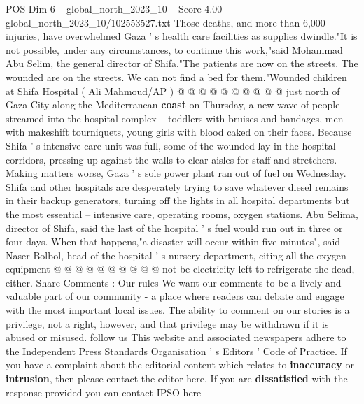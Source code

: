 \begin{textsample}{POS Dim 6 – global\_north\_2023\_10 – Score 4.00 – global\_north\_2023\_10/102553527.txt}
Those deaths, and more than 6,000 injuries, have overwhelmed Gaza ' s health care facilities as supplies dwindle."It is not possible, under any circumstances, to continue this work,"said Mohammad Abu Selim, the general director of Shifa."The patients are now on the streets.
The wounded are on the streets.
We can not find a bed for them."Wounded children at Shifa Hospital ( Ali Mahmoud/AP ) @ @ @ @ @ @ @ @ @ @ just north of Gaza City along the Mediterranean \textbf{coast} on Thursday, a new wave of people streamed into the hospital complex -- toddlers with bruises and bandages, men with makeshift tourniquets, young girls with blood caked on their faces.
Because Shifa ' s intensive care unit was full, some of the wounded lay in the hospital corridors, pressing up against the walls to clear aisles for staff and stretchers.
Making matters worse, Gaza ' s sole power plant ran out of fuel on Wednesday.
Shifa and other hospitals are desperately trying to save whatever diesel remains in their backup generators, turning off the lights in all hospital departments but the most essential -- intensive care, operating rooms, oxygen stations.
Abu Selima, director of Shifa, said the last of the hospital ' s fuel would run out in three or four days.
When that happens,"a disaster will occur within five minutes", said Naser Bolbol, head of the hospital ' s nursery department, citing all the oxygen equipment @ @ @ @ @ @ @ @ @ @ not be electricity left to refrigerate the dead, either.
Share Comments : Our rules We want our comments to be a lively and valuable part of our community - a place where readers can debate and engage with the most important local issues.
The ability to comment on our stories is a privilege, not a right, however, and that privilege may be withdrawn if it is abused or misused. follow us This website and associated newspapers adhere to the Independent Press Standards Organisation ' s Editors ' Code of Practice.
If you have a complaint about the editorial content which relates to \textbf{inaccuracy} or \textbf{intrusion}, then please contact the editor here.
If you are \textbf{dissatisfied} with the response provided you can contact IPSO here

\end{textsample}

